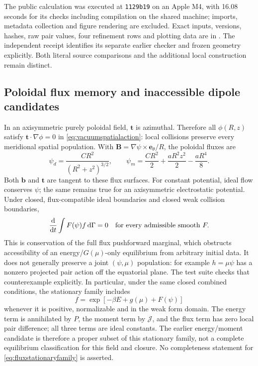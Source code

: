 \documentclass[11pt,letterpaper]{article}
\newcommand{\J}{\mathcal J}
\newcommand{\dd}{\mathrm d}
\begin{document}
The public calculation was executed at \texttt{1129b19} on an Apple M4,
with 16.08 seconds for its checks including compilation on the shared machine;
imports, metadata collection and figure rendering are excluded. Exact inputs,
versions, hashes, raw pair values, four refinement rows and plotting data are
in . The independent receipt identifies its
separate earlier checker and frozen geometry explicitly. Both literal source
comparisons and the additional local construction remain distinct.

\clearpage
\subsection*{Poloidal flux memory and inaccessible dipole candidates}
In an axisymmetric purely poloidal field, $\mathbf t$ is azimuthal. Therefore
all $\phi(R,z)$ satisfy $\mathbf t\cdot\nabla\phi=0$ in
\eqref{eq:vacuumspatialaction}: local
collisions preserve every meridional spatial population. With
$\mathbf B=\nabla\psi\times\mathbf e_\theta/R$, the poloidal fluxes are
\begin{equation}
 \psi_d=\frac{CR^2}{(R^2+z^2)^{3/2}},\qquad
 \psi_m=\frac{CR^2}{2}+\frac{aR^2z^2}{2}-\frac{aR^4}{8}.
 \label{eq:poloidalflux}
\end{equation}
Both $\mathbf b$ and $\mathbf t$ are tangent to these flux surfaces.
For constant potential, ideal flow conserves $\psi$; the same remains true
for an axisymmetric electrostatic potential. Under closed, flux-compatible
ideal boundaries and closed weak collision boundaries,
\begin{equation}
 \frac{\dd}{\dd t}\int F(\psi) f\,\dd\Gamma=0
 \quad\hbox{for every admissible smooth }F.
 \label{eq:fluxpopulation}
\end{equation}
This is conservation of the full flux pushforward marginal, which obstructs
accessibility of an energy/$G(\mu)$-only equilibrium from arbitrary initial
data. It does not generally preserve a joint $(\psi,\mu)$ population:
for example $h=\mu\psi$ has a nonzero projected pair action off the
equatorial plane. The test suite checks that counterexample explicitly.
In particular, under the same closed combined conditions, the stationary
family includes
\begin{equation}
 f=\exp[-\beta E+g(\mu)+F(\psi)]
 \label{eq:fluxstationaryfamily}
\end{equation}
whenever it is positive, normalizable and in the weak form domain.
The energy term is annihilated by $P$, the moment term by $\J$, and the flux
term has zero local pair difference; all three terms are ideal constants.
The earlier energy/moment candidate is therefore a proper subset of this
stationary family, not a complete equilibrium classification for this field
and closure. No completeness statement for \eqref{eq:fluxstationaryfamily}
is asserted.
\end{document}
